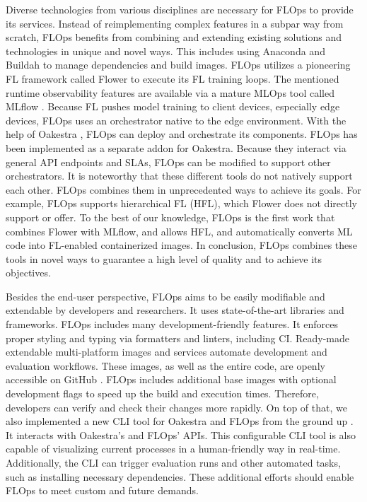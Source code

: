 Diverse technologies from various disciplines are necessary for FLOps to provide its services.
Instead of reimplementing complex features in a subpar way from scratch, FLOps benefits from combining and extending existing solutions and technologies in unique and novel ways.
This includes using Anaconda \cite{docs:anaconda} and Buildah \cite{buildah_homepage} to manage dependencies and build images.
FLOps utilizes a pioneering FL framework called Flower \cite{flower_docs} to execute its FL training loops.
The mentioned runtime observability features are available via a mature MLOps tool called MLflow \cite{mlflow:docs}.
Because FL pushes model training to client devices, especially edge devices, FLOps uses an orchestrator native to the edge environment.
With the help of Oakestra \cite{paper:oakestra_usenix}, FLOps can deploy and orchestrate its components.
FLOps has been implemented as a separate addon for Oakestra.
Because they interact via general API endpoints and SLAs, FLOps can be modified to support other orchestrators.
It is noteworthy that these different tools do not natively support each other.
FLOps combines them in unprecedented ways to achieve its goals.
For example, FLOps supports hierarchical FL (HFL), which Flower does not directly support or offer.
To the best of our knowledge, FLOps is the first work that combines Flower with MLflow, and allows HFL, and automatically converts ML code into FL-enabled containerized images.
In conclusion, FLOps combines these tools in novel ways to guarantee a high level of quality and to achieve its objectives.

Besides the end-user perspective, FLOps aims to be easily modifiable and extendable by developers and researchers.
It uses state-of-the-art libraries and frameworks.
FLOps includes many development-friendly features.
It enforces proper styling and typing via formatters and linters, including CI.
Ready-made extendable multi-platform images and services automate development and evaluation workflows.
These images, as well as the entire code, are openly accessible on GitHub \cite{flops_code}.
FLOps includes additional base images with optional development flags to speed up the build and execution times.
Therefore, developers can verify and check their changes more rapidly.
On top of that, we also implemented a new CLI tool for Oakestra and FLOps from the ground up \cite{cli_code}.
It interacts with Oakestra's and FLOps' APIs.
This configurable CLI tool is also capable of visualizing current processes in a human-friendly way in real-time.
Additionally, the CLI can trigger evaluation runs and other automated tasks, such as installing necessary dependencies.
These additional efforts should enable FLOps to meet custom and future demands.